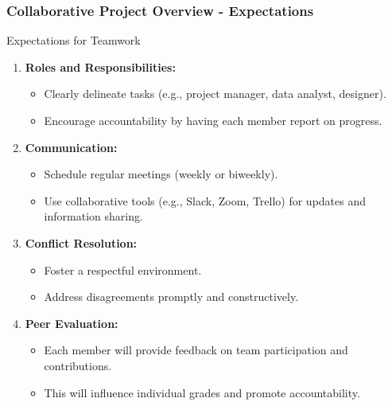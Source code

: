 \documentclass{beamer}
\begin{document}
\begin{frame}[fragile]
    \frametitle{Collaborative Project Overview - Expectations}
    
    \begin{block}{Expectations for Teamwork}
        \begin{enumerate}
            \item \textbf{Roles and Responsibilities:}
            \begin{itemize}
                \item Clearly delineate tasks (e.g., project manager, data analyst, designer).
                \item Encourage accountability by having each member report on progress.
            \end{itemize}

            \item \textbf{Communication:}
            \begin{itemize}
                \item Schedule regular meetings (weekly or biweekly).
                \item Use collaborative tools (e.g., Slack, Zoom, Trello) for updates and information sharing.
            \end{itemize}

            \item \textbf{Conflict Resolution:}
            \begin{itemize}
                \item Foster a respectful environment.
                \item Address disagreements promptly and constructively.
            \end{itemize}

            \item \textbf{Peer Evaluation:}
            \begin{itemize}
                \item Each member will provide feedback on team participation and contributions.
                \item This will influence individual grades and promote accountability.
            \end{itemize}
        \end{enumerate}
    \end{block}
\end{frame}
\end{document}
